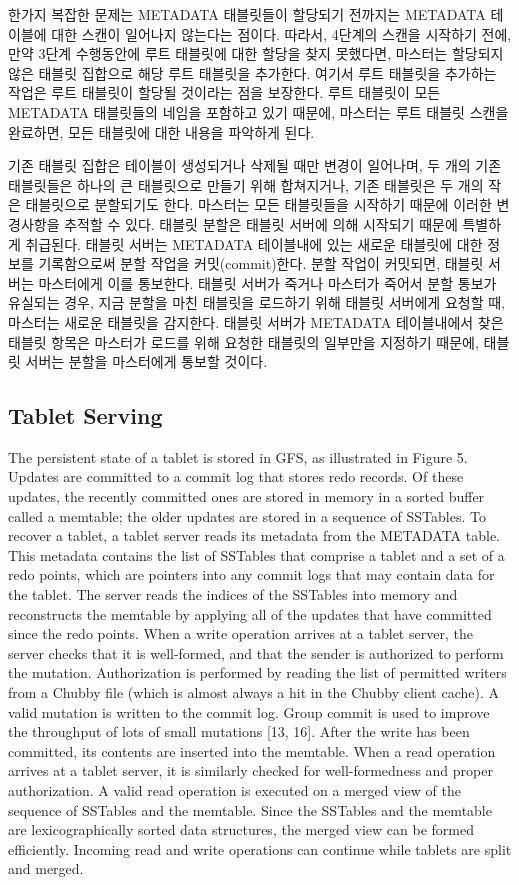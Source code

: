 \documentclass[twocolumn]{article}
\begin{document}
한가지 복잡한 문제는 METADATA 태블릿들이 할당되기 전까지는 METADATA 테이블에 대한 스캔이 일어나지 않는다는 점이다.
따라서, 4단계의 스캔을 시작하기 전에, 만약 3단계 수행동안에 루트 태블릿에 대한 할당을 찾지 못했다면, 마스터는 할당되지 않은 태블릿 집합으로 해당 루트 태블릿을 추가한다. 여기서 루트 태블릿을 추가하는 작업은 루트 태블릿이 할당될 것이라는 점을 보장한다.
루트 태블릿이 모든 METADATA 태블릿들의 네임을 포함하고 있기 때문에, 마스터는 루트 태블릿 스캔을 완료하면, 모든 태블릿에 대한 내용을 파악하게 된다.

기존 태블릿 집합은 테이블이 생성되거나 삭제될 때만 변경이 일어나며,
두 개의 기존 태블릿들은 하나의 큰 태블릿으로 만들기 위해 합쳐지거나, 기존 태블릿은 두 개의 작은 태블릿으로 분할되기도 한다.
마스터는 모든 태블릿들을 시작하기 때문에 이러한 변경사항을 추적할 수 있다.
태블릿 분할은  태블릿 서버에 의해 시작되기 때문에 특별하게 취급된다.
태블릿 서버는 METADATA 테이블내에 있는 새로운 태블릿에 대한 정보를 기록함으로써 분할 작업을 커밋(commit)한다.
분할 작업이 커밋되면, 태블릿 서버는 마스터에게 이를 통보한다.
태블릿 서버가 죽거나 마스터가 죽어서 분할 통보가 유실되는 경우,
지금 분할을 마친 태블릿을 로드하기 위해 태블릿 서버에게 요청할 때, 마스터는 새로운 태블릿을 감지한다.
태블릿 서버가 METADATA 테이블내에서 찾은 태블릿 항목은 마스터가 로드를 위해 요청한 태블릿의 일부만을 지정하기 때문에, 
태블릿 서버는 분할을 마스터에게 통보할 것이다.


\subsection{Tablet Serving}

The persistent state of a tablet is stored in GFS, as illustrated in Figure 5. Updates are committed to a commit log that stores redo records. Of these updates, the recently committed ones are stored in memory in a sorted buffer called a memtable; the older updates are stored in a sequence of SSTables. To recover a tablet, a tablet server reads its metadata from the METADATA table. This metadata contains the list of SSTables that comprise a tablet and a set of a redo points, which are pointers into any commit logs that may contain data for the tablet. The server reads the indices of the SSTables into memory and reconstructs the memtable by applying all of the updates that have committed since the redo points.
When a write operation arrives at a tablet server, the server checks that it is well-formed, and that the sender is authorized to perform the mutation. Authorization is performed by reading the list of permitted writers from a Chubby file (which is almost always a hit in the Chubby client cache). A valid mutation is written to the commit log. Group commit is used to improve the throughput of lots of small mutations [13, 16]. After the write has been committed, its contents are inserted into the memtable.
When a read operation arrives at a tablet server, it is similarly checked for well-formedness and proper authorization. A valid read operation is executed on a merged view of the sequence of SSTables and the memtable. Since the SSTables and the memtable are lexicographically sorted data structures, the merged view can be formed efficiently.
Incoming read and write operations can continue while tablets are split and merged.
\end{document}
